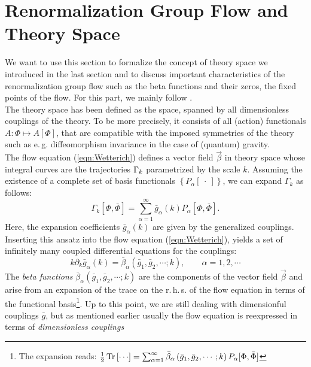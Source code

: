 \section{Renormalization Group Flow and Theory Space}
We want to use this section to formalize the concept of theory space we introduced in the last section and to discuss important characteristics of the renormalization group flow such as the beta functions and their zeros, the fixed points of the flow. For this part, we mainly follow \cite{ReuterSaueressig2012}. \\
The theory space has been defined as the space, spanned by all dimensionless couplings of the theory. To be more precisely, it consists of all (action) functionals $A:\Phi \mapsto A[\Phi]$, that are compatible with the imposed symmetries of the theory such as e.\,g. diffeomorphism invariance in the case of (quantum) gravity. \\
The flow equation (\ref{eqn:Wetterich}) defines a vector field $\vec{\beta}$ in theory space whose integral curves are the trajectories $\Gamma_{k}$ parametrized by the scale $k$. Assuming the existence of a complete set of basis functionals $\left\{P_{\alpha}[\ \cdot \ ]\right\}$, we can expand $\Gamma_k$ as follows:
\begin{equation}
	\Gamma_{k}[\Phi, \bar{\Phi}]=\sum_{\alpha=1}^{\infty} \bar{g}_{\alpha}(k) P_{\alpha}[\Phi, \bar{\Phi}].
\end{equation}
Here, the expansion coefficients $ \bar{g}_{\alpha}(k)$ are given by the generalized couplings. Inserting this ansatz into the flow equation (\ref{eqn:Wetterich}), yields a set of infinitely many coupled differential equations for the couplings:
\begin{equation}
	k \partial_{k} \bar{g}_{\alpha}(k)=\bar{\beta}_{\alpha}\left(\bar{g}_{1}, \bar{g}_{2}, \cdots ; k\right), \qquad \alpha=1,2, \cdots
\end{equation}
The \textit{beta functions} $\bar{\beta}_{\alpha}\left(\bar{g}_{1}, \bar{g}_{2}, \cdots ; k\right)$  are the components of the vector field $\vec{\beta}$ and arise from an expansion of the trace on the r.\,h.\,s. of the flow equation in terms of the functional basis\footnote{The expansion reads: $\frac{1}{2}\tr{\cdots} = \sum_{\alpha=1}^{\infty} \bar{\beta}_{\alpha}\left(\bar{g}_{1}, \bar{g}_{2}, \cdots ; k\right) P_{\alpha}[\Phi, \bar{\Phi}]$}. Up to this point, we are still dealing with dimensionful couplings $\bar{g}$, but as mentioned earlier usually the flow equation is reexpressed in terms of \textit{dimensionless couplings}
